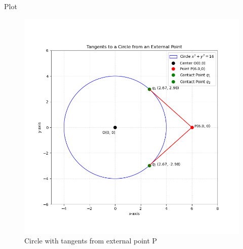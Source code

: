 \documentclass{beamer}
\begin{document}
	\begin{frame}{Plot}
		\begin{figure}[H]
			\centering
			\includegraphics[width=0.85\linewidth]{figs/tangents_plot}
			\caption{Circle with tangents from external point P}
			\label{fig:tangentsplot}
		\end{figure}
	\end{frame}
	
\end{document}
